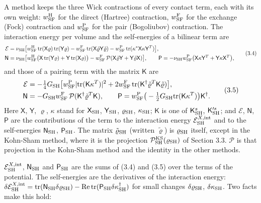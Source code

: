 \documentclass[
  10pt,
]{article}
\begin{document}
A method keeps the three Wick contractions of every contact term, each
with its own weight: \(w^{\rm H}_{\rm SF}\) for the direct (Hartree)
contraction, \(w^{\rm F}_{\rm SF}\) for the exchange (Fock) contraction
and \(w^{\rm P}_{\rm SF}\) for the pair (Bogoliubov) contraction. The
interaction energy per volume and the self-energies of a bilinear term
are
\[\begin{aligned}\mathcal E&=\nu_{\rm SH}\big[w^{\rm H}_{\rm SF}\,\mathrm{tr}(\mathsf X\varrho)\,\mathrm{tr}(\mathsf Y\varrho)-w^{\rm F}_{\rm SF}\,\mathrm{tr}(\mathsf X\tilde\varrho\mathsf Y\tilde\varrho)-w^{\rm P}_{\rm SF}\,\mathrm{tr}(\kappa^*\mathsf X\kappa\mathsf Y^T)\big],\\
\mathsf N&=\nu_{\rm SH}\big[w^{\rm H}_{\rm SF}\big(\mathsf X\,\mathrm{tr}(\mathsf Y\varrho)+\mathsf Y\,\mathrm{tr}(\mathsf X\varrho)\big)-w^{\rm F}_{\rm SF}\,\mathcal P(\mathsf X\tilde\varrho\mathsf Y+\mathsf Y\tilde\varrho\mathsf X)\big],\qquad
\mathsf P=-\nu_{\rm SH}w^{\rm P}_{\rm SF}\big(\mathsf X\kappa\mathsf Y^T+\mathsf Y\kappa\mathsf X^T\big),\end{aligned}\tag{3.4}\]
and those of a pairing term with the matrix \(\mathsf K\) are
\[\begin{aligned}\mathcal E&=-\tfrac14G_{\rm SH}\big[w^{\rm P}_{\rm SF}\lvert\mathrm{tr}(\mathsf K\kappa^T)\rvert^2+2w^{\rm F}_{\rm SF}\,\mathrm{tr}(\mathsf K^\dagger\tilde\varrho^T\mathsf K\tilde\varrho)\big],\\
\mathsf N&=-G_{\rm SH}w^{\rm F}_{\rm SF}\,\mathcal P(\mathsf K^\dagger\tilde\varrho^T\mathsf K),\qquad\mathsf P=w^{\rm P}_{\rm SF}\big(-\tfrac12G_{\rm SH}\mathrm{tr}(\mathsf K\kappa^T)\big)\mathsf K^\dagger.\end{aligned}\tag{3.5}\]
Here \(\mathsf X\), \(\mathsf Y\), \(\varrho\), \(\kappa\) stand for
\(\mathsf X_{\rm SH}\), \(\mathsf Y_{\rm SH}\), \(\varrho_{\rm SH}\),
\(\kappa_{\rm SH}\); \(\mathsf K\) is one of \(\mathsf K^s_{\rm SH}\),
\(\mathsf K'^s_{\rm SH}\); and \(\mathcal E\), \(\mathsf N\),
\(\mathsf P\) are the contributions of the term to the interaction
energy \(\mathcal E^{X,{\rm int}}_{\rm SH}\) and to the self-energies
\(\mathsf N_{\rm SH}\), \(\mathsf P_{\rm SH}\). The matrix
\(\tilde\varrho_{\rm SH}\) (written \(\tilde\varrho\)) is
\(\varrho_{\rm SH}\) itself, except in the Kohn-Sham method, where it is
the projection \(\mathcal P^{\rm KS}_{\rm SH}(\varrho_{\rm SH})\) of
Section 3.3. \(\mathcal P\) is that projection in the Kohn-Sham method
and the identity in the other methods.

\(\mathcal E^{X,{\rm int}}_{\rm SH}\), \(\mathsf N_{\rm SH}\) and
\(\mathsf P_{\rm SH}\) are the sums of (3.4) and (3.5) over the terms of
the potential. The self-energies are the derivatives of the interaction
energy:
\(\delta\mathcal E^{X,{\rm int}}_{\rm SH}=\mathrm{tr}(\mathsf N_{\rm SH}\delta\varrho_{\rm SH})-\mathrm{Re}\,\mathrm{tr}(\mathsf P_{\rm SH}\delta\kappa_{\rm SH}^\dagger)\)
for small changes \(\delta\varrho_{\rm SH}\), \(\delta\kappa_{\rm SH}\).
Two facts make this hold:
\end{document}
